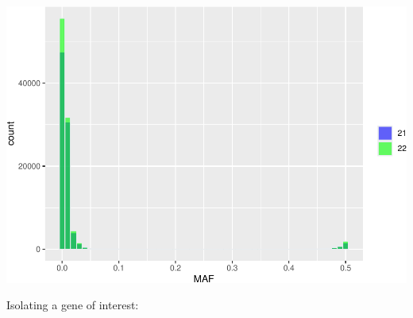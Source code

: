 \documentclass[
]{article}
\begin{document}
\includegraphics{GWASvisualizations_files/figure-latex/unnamed-chunk-13-1.pdf}

Isolating a gene of interest:
\end{document}
